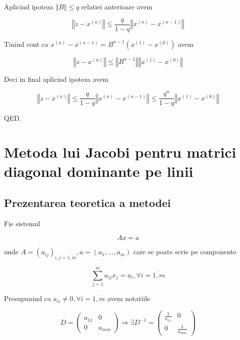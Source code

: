 \documentclass[a4paper,twoside]{book}
\begin{document}
Aplicind ipoteza $\left\Vert B\right\Vert \leq q$ relatiei anterioare avem

\begin{equation*}
\left\Vert z-x^{(n)}\right\Vert \leq \frac{q}{1-q}\left\Vert
x^{(n)}-x^{(n-1)}\right\Vert
\end{equation*}

Tinind cont ca $x^{(n)}-x^{(n-1)}=B^{n-1}(x^{(1)}-x^{(0)})$ avem

\begin{equation*}
\left\Vert z-x^{(n)}\right\Vert \leq \left\Vert B^{n-1}\right\Vert
\left\Vert x^{(1)}-x^{(0)}\right\Vert
\end{equation*}

Deci in final aplicind ipoteza avem

\begin{equation*}
\left\Vert z-x^{(n)}\right\Vert \leq \frac{q}{1-q}\left\Vert
x^{(n)}-x^{(n-1)}\right\Vert \leq \frac{q^{n}}{1-q}\left\Vert
x^{(1)}-x^{(0)}\right\Vert
\end{equation*}

QED.

\section{Metoda lui Jacobi pentru matrici diagonal dominante pe linii}

\subsection{Prezentarea teoretica a metodei}

Fie sistemul

\begin{equation}
Ax=a  \label{3}
\end{equation}

unde $A=(a_{ij})_{i,j=\overline{1,m}},a=(a_{1},...,a_{m})$ care se poate
scrie pe componente

\begin{equation}
\sum_{j=1}^{m}a_{ij}x_{j}=a_{i},\forall i=\overline{1,m}  \label{3prim}
\end{equation}

Presupunind ca $a_{ii}\neq 0,\forall i=\overline{1,m}$ avem notatiile

\begin{equation*}
D=\left( 
\begin{array}{cc}
a_{11} & 0 \\ 
0 & a_{mm}%
\end{array}%
\right) \Rightarrow \exists D^{-1}=\left( 
\begin{array}{cc}
\frac{1}{a_{11}} & 0 \\ 
0 & \frac{1}{a_{mm}}%
\end{array}%
\right)
\end{equation*}
\end{document}
